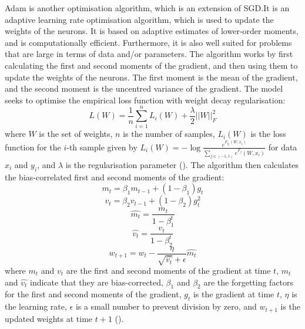 \documentclass[12pt]{report}
\begin{document}
Adam is another optimisation algorithm, which is an extension of SGD.\@ It is an adaptive learning rate optimisation algorithm, which is used to update the weights of the neurons. It is based on adaptive estimates of lower-order moments, and is computationally efficient. Furthermore, it is also well suited for problems that are large in terms of data and/or parameters. The algorithm works by first calculating the first and second moments of the gradient, and then using them to update the weights of the neurons. The first moment is the mean of the gradient, and the second moment is the uncentred variance of the gradient. The model seeks to optimise the empirical loss function with weight decay regularisation:
\begin{equation}
	L(W) = \frac{1}{n}\sum_{i=1}^{n}L_i(W)+\frac{\lambda}{2}||W||_F^2
\end{equation}
where $W$ is the set of weights, $n$ is the number of samples, $L_i(W)$ is the loss function for the $i$-th sample given by $L_i(W)=-\log\frac{e^{F_{y_i}(W,x_i)}}{\sum_{j\in(-1,1)}e^{F_j}(W,x_i)}$ for data $x_{i}$ and $y_{i}$, and $\lambda$ is the regularisation parameter (\cite{zou2021}). The algorithm then calculates the bias-correlated first and second moments of the gradient:
\begin{equation}
	m_t = \beta_1 m_{t-1} + (1-\beta_1)g_t
\end{equation}
\begin{equation}
	v_t = \beta_2 v_{t-1} + (1-\beta_2)g_t^2
\end{equation}
\begin{equation}
	\hat{m_t} = \frac{m_t}{1-\beta_1^t}
\end{equation}
\begin{equation}
	\hat{v_t} = \frac{v_t}{1-\beta_2^t}
\end{equation}
\begin{equation}
	w_{t+1} = w_t - \frac{\eta}{\sqrt{\hat{v_t}}+\epsilon}\hat{m_t}
\end{equation}
where $m_t$ and $v_t$ are the first and second moments of the gradient at time $t$, $\hat{m_t}$ and $\hat{v_t}$ indicate that they are bias-corrected, $\beta_1$ and $\beta_2$ are the forgetting factors for the first and second moments of the gradient, $g_t$ is the gradient at time $t$, $\eta$ is the learning rate, $\epsilon$ is a small number to prevent division by zero, and $w_{t+1}$ is the updated weights at time $t+1$ (\cite{kingma2017}).
\end{document}
